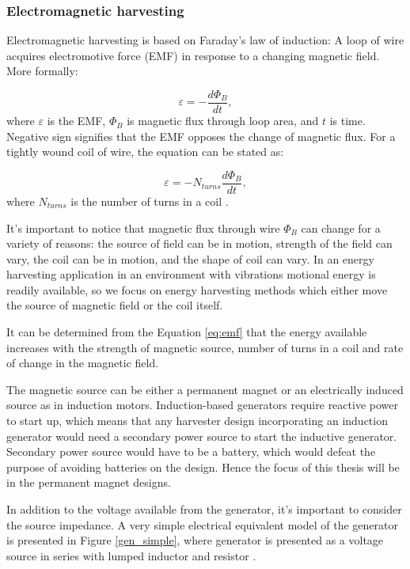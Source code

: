 \subsubsection{Electromagnetic harvesting} \label{sect:em_harvest}
Electromagnetic harvesting is based on Faraday's law of induction: A loop of wire acquires electromotive force (EMF) in response to a changing magnetic field. More formally:

\begin{equation}
  \varepsilon = - \frac{d \Phi_ {B}}{d t} , 
\end{equation}
where $\varepsilon$ is the EMF, $\Phi_{B}$ is magnetic flux through loop area, and $t$ is time. Negative sign signifies that the EMF opposes the change of magnetic flux. For a tightly wound coil of wire, the equation can be stated as: 

\begin{equation} \label{eq:emf}
  \varepsilon = -N_{turns} \frac{d \Phi_{B}}{d t} , 
\end{equation}
where $N_{turns}$ is the number of turns in a coil \cite[p.998]{universityphysics}.

It's important to notice that magnetic flux through wire $ \Phi_{B} $ can change for a variety of reasons: the source of field can be in motion, strength of the field can vary, the coil can be in motion, and the shape of coil can vary. In an energy harvesting application in an environment with vibrations motional energy is readily available, so we focus on energy harvesting methods which either move the source of magnetic field or the coil itself.

It can be determined from the Equation \eqref{eq:emf} that the energy available increases with the strength of magnetic source, number of turns in a coil and rate of change in the magnetic field. 

The magnetic source can be either a permanent magnet or an electrically induced source as in induction motors. Induction-based generators require reactive power to start up, which means that any harvester design incorporating an induction generator would need a secondary power source to start the inductive generator. Secondary power source would have to be a battery, which would defeat the purpose of avoiding batteries on the design. Hence the focus of this thesis will be in the permanent magnet designs.

In addition to the voltage available from the generator, it's important to consider the source impedance. A very simple electrical equivalent model of the generator is presented in Figure \ref{gen_simple}, where generator is presented as a voltage source in series with lumped inductor and resistor \cite{Jirutitijaroen2012}. 


